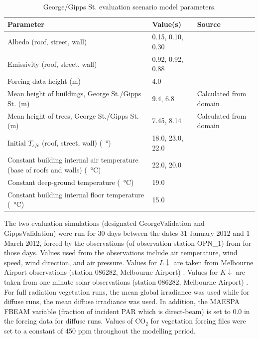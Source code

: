 \documentclass[final,3p,times,authoryear]{elsarticle}
\begin{document}
\begin{table}[!htbp]
\caption{George/Gipps St. evaluation scenario model parameters. \label{tab:modcomvalpara}}     
\begin{tabular}{| p{8.0cm} | l | l|}
\hline
\textbf{Parameter} & \textbf{Value(s)}& \textbf{Source} \\ \hline
Albedo (roof, street, wall)   & 0.15, 0.10, 0.30 & \cite{Krayenhoff2007}   \\ \hline
Emissivity (roof, street, wall)   & 0.92, 0.92, 0.88 & \cite{Krayenhoff2007}   \\ \hline
Forcing data height (m)  & 4.0 & \cite{Coutts2015}   \\ \hline
Mean height of buildings, George St./Gipps St. (m)  & 9.4, 6.8  & Calculated from domain  \\ \hline
Mean height of trees, George St./Gipps St. (m)  & 7.45, 8.14  & Calculated from domain  \\ \hline
Initial $T_{sfc}$ (roof, street, wall) (\SI{}{\degree})  & 18.0, 23.0, 22.0  & \cite{Krayenhoff2007}  \\ \hline
Constant building internal air temperature (base of roofs and walls) (\SI{}{\degreeCelsius})  & 22.0, 20.0  & \cite{Krayenhoff2007}  \\ \hline
Constant deep-ground temperature (\SI{}{\degreeCelsius})  & 19.0 & \cite{Krayenhoff2007}  \\ \hline
Constant building internal floor temperature (\SI{}{\degreeCelsius})  & 15.0 & \cite{Krayenhoff2007}  \\ \hline
\end{tabular}
\end{table}

The two evaluation simulations (designated GeorgeValidation and GippsValidation) were run for 30 days between the dates 31 January 2012 and 1 March 2012, forced by the observations (of observation station OPN\_1) from \cite{Coutts2015} for those days. Values used from the observations include air temperature, wind speed, wind direction, and air pressure. Values for $L\downarrow$ are taken from Melbourne Airport observations (station 086282, Melbourne Airport) \citep{BOM2016b}. Values for $K\downarrow$ are taken from one minute solar observations (station 086282, Melbourne Airport) \citep{BOM2016}.  For full radiation vegetation runs, the mean global irradiance was used while for diffuse runs, the mean diffuse irradiance was used. In addition, the MAESPA FBEAM variable (fraction of incident PAR which is direct-beam) is set to 0.0 in the forcing data for diffuse runs. Values of CO$_{2}$ for vegetation forcing files were set to a constant of 450 ppm throughout the modelling period.
\end{document}
